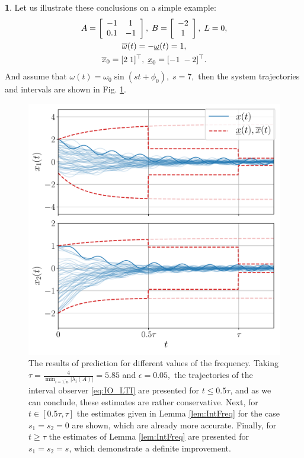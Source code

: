 \documentclass[letterpaper, 10 pt, conference]{ieeeconf}
\theoremstyle{plain}
\theoremstyle{definition}
\newtheorem*{example*}{\protect\examplename}
\theoremstyle{plain}
\theoremstyle{plain}
\theoremstyle{remark}
\providecommand{\examplename}{Example}
\begin{document}
\begin{example*}
Let us illustrate these conclusions on a simple example:
\begin{gather*}
A=\left[\begin{array}{cc}
-1 & 1\\
0.1 & -1
\end{array}\right],\;B=\left[\begin{array}{c}
-2\\
1
\end{array}\right],\;L=0,\\
\overline{\omega}(t)=-\underline{\omega}(t)=1,\\
\overline{x}_{0}=[2\;1]^{\top},\;\underline{x}_{0}=[-1\;-2]^{\top}.
\end{gather*}
And assume that
$
\omega(t)=\omega_0\sin(st+\phi_0),\;s=7,
$
then the system trajectories and intervals are shown in Fig. \ref{fig:IntFreq}. 
\begin{figure}
\begin{centering}
\includegraphics[width=\linewidth]{asymptotic}
\par\end{centering}
\caption{\label{fig:IntFreq} The results of prediction for different values
of the frequency. Taking $\tau=\frac{4}{\min_{i=\overline{1,n}}|\lambda_{i}(A)|}=5.85$ and $\epsilon=0.05,$ the trajectories of the interval observer \eqref{eq:IO_LTI} are presented for $t\leq0.5\tau$, and as we can conclude, these estimates are rather conservative. Next, for $t\in[0.5\tau,\tau]$ the estimates given in Lemma \ref{lem:IntFreq} for the case $s_{1}=s_{2}=0$ are shown, which are already more accurate. Finally, for $t\geq\tau$ the estimates of Lemma \ref{lem:IntFreq} are presented for $s_{1}=s_{2}=s$, which demonstrate a definite improvement. }
\end{figure}
\end{example*}
\end{document}
